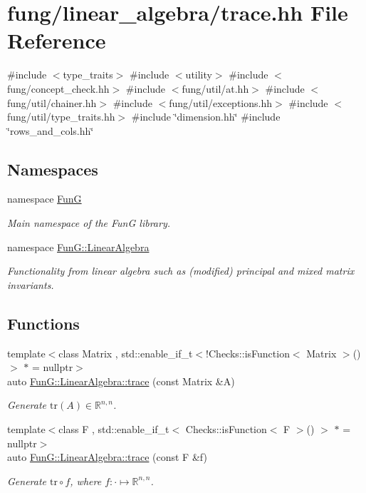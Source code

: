 \hypertarget{trace_8hh}{\section{fung/linear\-\_\-algebra/trace.hh \-File \-Reference}
\label{trace_8hh}
}
{\ttfamily \#include $<$type\-\_\-traits$>$}\*
{\ttfamily \#include $<$utility$>$}\*
{\ttfamily \#include $<$fung/concept\-\_\-check.\-hh$>$}\*
{\ttfamily \#include $<$fung/util/at.\-hh$>$}\*
{\ttfamily \#include $<$fung/util/chainer.\-hh$>$}\*
{\ttfamily \#include $<$fung/util/exceptions.\-hh$>$}\*
{\ttfamily \#include $<$fung/util/type\-\_\-traits.\-hh$>$}\*
{\ttfamily \#include \char`\"{}dimension.\-hh\char`\"{}}\*
{\ttfamily \#include \char`\"{}rows\-\_\-and\-\_\-cols.\-hh\char`\"{}}\*
\subsection*{\-Namespaces}
\begin{DoxyCompactItemize}
\item 
namespace \hyperlink{namespaceFunG}{\-Fun\-G}
\begin{DoxyCompactList}\small\item\em \-Main namespace of the \-Fun\-G library. \end{DoxyCompactList}\item 
namespace \hyperlink{namespaceFunG_1_1LinearAlgebra}{\-Fun\-G\-::\-Linear\-Algebra}
\begin{DoxyCompactList}\small\item\em \-Functionality from linear algebra such as (modified) principal and mixed matrix invariants. \end{DoxyCompactList}\end{DoxyCompactItemize}
\subsection*{\-Functions}
\begin{DoxyCompactItemize}
\item 
{\footnotesize template$<$class Matrix , std\-::enable\-\_\-if\-\_\-t$<$!\-Checks\-::is\-Function$<$ Matrix $>$()$>$ $\ast$  = nullptr$>$ }\\auto \hyperlink{group__LinearAlgebraGroup_ga4d73eb4d46dd9196a31e2d6d557d509e}{\-Fun\-G\-::\-Linear\-Algebra\-::trace} (const \-Matrix \&\-A)
\begin{DoxyCompactList}\small\item\em \-Generate $\mathrm{tr}(A)\in\mathbb{R}^{n,n}$. \end{DoxyCompactList}\item 
{\footnotesize template$<$class F , std\-::enable\-\_\-if\-\_\-t$<$ Checks\-::is\-Function$<$ F $>$() $>$ $\ast$  = nullptr$>$ }\\auto \hyperlink{group__LinearAlgebraGroup_ga950717870525c43be79245413717673c}{\-Fun\-G\-::\-Linear\-Algebra\-::trace} (const \-F \&f)
\begin{DoxyCompactList}\small\item\em \-Generate $\mathrm{tr}\circ f$, where $f:\cdot\mapsto\mathbb{R}^{n,n} $. \end{DoxyCompactList}\end{DoxyCompactItemize}
